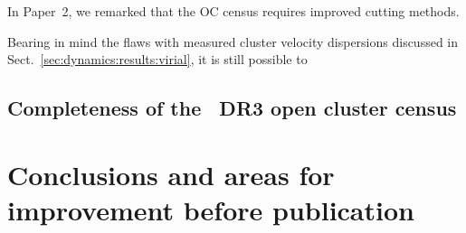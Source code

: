 In Paper~2, we remarked that the OC census requires improved cutting methods.

Bearing in mind the flaws with measured cluster velocity dispersions discussed in Sect.~\ref{sec:dynamics:results:virial}, it is still possible to 


\subsection{Completeness of the \gaia\ DR3 open cluster census}
\label{sec:dynamics:results:completeness}


\section{Conclusions and areas for improvement before publication}
\label{sec:dynamics:conclusion}
